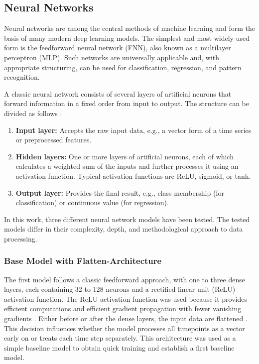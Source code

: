 \subsection{Neural Networks}
\label{chap:nn}

Neural networks are among the central methods of machine learning and form the basis of many modern deep learning models.
The simplest and most widely used form is the feedforward neural network (FNN), also known as a multilayer perceptron (MLP).
Such networks are universally applicable and, with appropriate structuring, can be used for classification, regression, and pattern recognition.

A classic neural network consists of several layers of artificial neurons that forward information in a fixed order from input to output.
The structure can be divided as follows \cite{nn-basics}:

\begin{enumerate}
    \item \textbf{Input layer:} Accepts the raw input data, e.g., a vector form of a time series or preprocessed features.
    \item \textbf{Hidden layers:} One or more layers of artificial neurons, each of which calculates a weighted sum of the inputs and further processes it using an activation function.
    Typical activation functions are ReLU, sigmoid, or tanh.
    \item \textbf{Output layer:} Provides the final result, e.g., class membership (for classification) or continuous value (for regression).
\end{enumerate}

\noindent
In this work, three different neural network models have been tested.
The tested models differ in their complexity, depth, and methodological approach to data processing.

\subsubsection{Base Model with Flatten-Architecture}

The first model follows a classic feedforward approach, with one to three dense layers, each containing 32 to 128 neurons and a rectified linear unit (ReLU) activation function.
The ReLU activation function was used because it provides efficient computations and efficient gradient propagation with fewer vanishing gradients \cite{springer-ml-basics}.
Either before or after the dense layers, the input data are flattened \cite{keras-flatten}.
This decision influences whether the model processes all timepoints as a vector early on or treats each time step separately.
This architecture was used as a simple baseline model to obtain quick training and establish a first baseline model.

